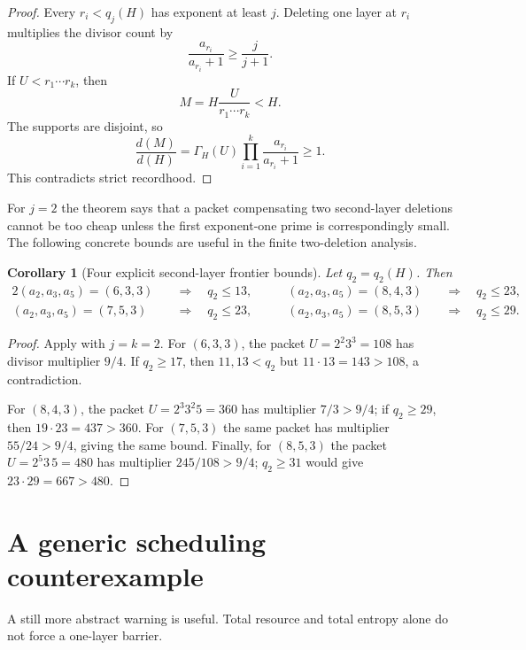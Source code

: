 \documentclass[11pt]{article}
\numberwithin{equation}{section}
\theoremstyle{blueplain}
\newtheorem{corollary}[theorem]{Corollary}
\theoremstyle{bluedef}
\begin{document}
\begin{proof}
Every $r_i<q_j(H)$ has exponent at least $j$.  Deleting one layer at $r_i$ multiplies the divisor count by
\[
 \frac{a_{r_i}}{a_{r_i}+1}\ge\frac{j}{j+1}.
\]
If $U<r_1\cdots r_k$, then
\[
 M=H\frac{U}{r_1\cdots r_k}<H.
\]
The supports are disjoint, so
\[
 \frac{d(M)}{d(H)}
 =\Gamma_H(U)\prod_{i=1}^k\frac{a_{r_i}}{a_{r_i}+1}
 \ge1.
\]
This contradicts strict recordhood.
\end{proof}

For $j=2$ the theorem says that a packet compensating two second-layer deletions cannot be too cheap unless the first exponent-one prime is correspondingly small.  The following concrete bounds are useful in the finite two-deletion analysis.

\begin{corollary}[Four explicit second-layer frontier bounds]
\label{cor:q2-bounds}
Let $q_2=q_2(H)$.  Then
\begin{alignat}{2}
 (a_2,a_3,a_5)=(6,3,3)&\quad\Longrightarrow\quad q_2\le13,\qquad&
 (a_2,a_3,a_5)=(8,4,3)&\quad\Longrightarrow\quad q_2\le23,\nonumber\\
 (a_2,a_3,a_5)=(7,5,3)&\quad\Longrightarrow\quad q_2\le23,&
 (a_2,a_3,a_5)=(8,5,3)&\quad\Longrightarrow\quad q_2\le29.
 \label{eq:q2-bounds}
\end{alignat}
\end{corollary}

\begin{proof}
Apply  with $j=k=2$.  For $(6,3,3)$, the packet $U=2^2 3^3=108$ has divisor multiplier $9/4$.  If $q_2\ge17$, then $11,13<q_2$ but $11\cdot13=143>108$, a contradiction.

For $(8,4,3)$, the packet $U=2^3 3^2 5=360$ has multiplier $7/3>9/4$; if $q_2\ge29$, then $19\cdot23=437>360$.  For $(7,5,3)$ the same packet has multiplier $55/24>9/4$, giving the same bound.  Finally, for $(8,5,3)$ the packet $U=2^5 3\,5=480$ has multiplier $245/108>9/4$; $q_2\ge31$ would give $23\cdot29=667>480$.
\end{proof}

\section{A generic scheduling counterexample}
\label{app:generic-scheduling-counterexample}

A still more abstract warning is useful.  Total resource and total entropy alone do not force a one-layer barrier.
\end{document}
